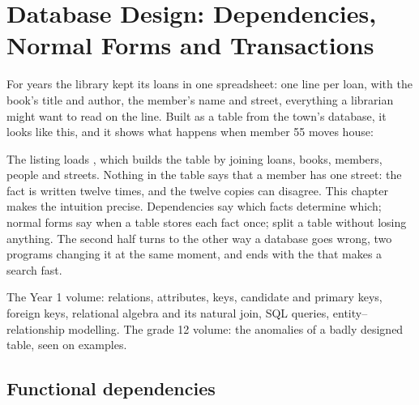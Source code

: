\chapter{Database Design: Dependencies, Normal Forms and Transactions}\label{ch:b2:database-design}

For years the library kept its loans in one spreadsheet: one line per loan, with the book's title and author, the
member's name and street, everything a librarian might want to read on the line. Built as a table from the town's
database, it looks like this, and it shows what happens when member 55 moves house:

\label{lst:b2:database-design:hook}

\label{out:b2:database-design:hook}

The listing loads , which builds the table by joining loans, books, members, people and streets.
Nothing in the table says that a member has one street: the fact is written twelve times, and the twelve copies can
disagree. This chapter makes the intuition precise. Dependencies say which facts determine which; normal forms say
when a table stores each fact once;  split a table without losing anything. The second half turns to the
other way a database goes wrong, two programs changing it at the same moment, and ends with the  that makes a
search fast.

\begin{recall}
The Year 1 volume: relations, attributes, keys, candidate and primary keys, foreign keys, relational algebra and its
natural join, SQL queries, entity--relationship modelling. The grade 12 volume: the anomalies of a badly designed table,
seen on examples.
\end{recall}

\section{Functional dependencies}\label{sec:b2:database-design:fd}


